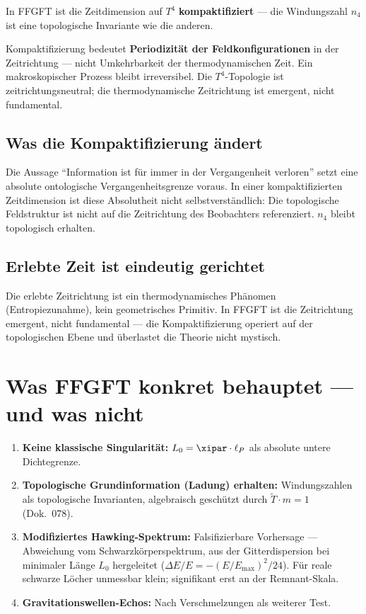 In FFGFT ist die Zeitdimension auf $T^4$ \textbf{kompaktifiziert} --- die Windungszahl $n_4$ ist eine topologische Invariante wie die anderen.

\begin{wichtig}
Kompaktifizierung bedeutet \textbf{Periodizität der Feldkonfigurationen} in der Zeitrichtung --- nicht Umkehrbarkeit der thermodynamischen Zeit. Ein makroskopischer Prozess bleibt irreversibel. Die $T^4$-Topologie ist zeitrichtungsneutral; die thermodynamische Zeitrichtung ist emergent, nicht fundamental.
\end{wichtig}

\subsection{Was die Kompaktifizierung ändert}

Die Aussage ``Information ist für immer in der Vergangenheit verloren'' setzt eine absolute ontologische Vergangenheitsgrenze voraus. In einer kompaktifizierten Zeitdimension ist diese Absolutheit nicht selbstverständlich: Die topologische Feldstruktur ist nicht auf die Zeitrichtung des Beobachters referenziert. $n_4$ bleibt topologisch erhalten.

\subsection{Erlebte Zeit ist eindeutig gerichtet}

Die erlebte Zeitrichtung ist ein thermodynamisches Phänomen (Entropiezunahme), kein geometrisches Primitiv. In FFGFT ist die Zeitrichtung emergent, nicht fundamental --- die Kompaktifizierung operiert auf der topologischen Ebene und überlastet die Theorie nicht mystisch.

\section{Was FFGFT konkret behauptet --- und was nicht}

\begin{enumerate}
  \item \textbf{Keine klassische Singularität:} $L_0 = \xipar \cdot \ell_P$ als absolute untere Dichtegrenze.
  \item \textbf{Topologische Grundinformation (Ladung) erhalten:} Windungszahlen als topologische Invarianten, algebraisch geschützt durch $\tilde{T} \cdot m = 1$ (Dok.~078).
  \item \textbf{Modifiziertes Hawking-Spektrum:} Falsifizierbare Vorhersage --- Abweichung vom Schwarzkörperspektrum, aus der Gitterdispersion bei minimaler Länge $L_0$ hergeleitet ($\Delta E/E = -(E/E_\text{max})^2/24$). Für reale schwarze Löcher unmessbar klein; signifikant erst an der Remnant-Skala.
  \item \textbf{Gravitationswellen-Echos:} Nach Verschmelzungen als weiterer Test.
\end{enumerate}

